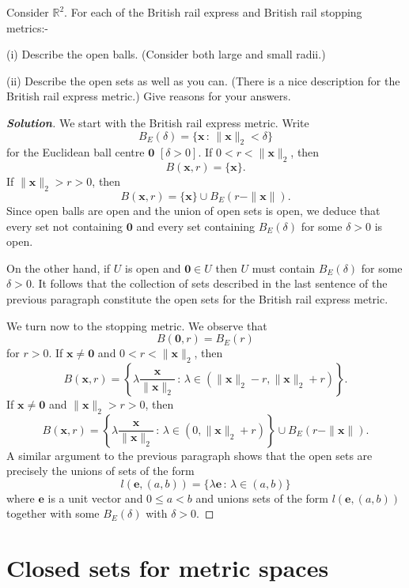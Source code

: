 \begin{theorem}\label{T;British rail balls}
Consider ${\mathbb R}^{2}$.
For each of the British rail express and
British rail stopping metrics:-

(i) Describe the open balls. (Consider both large
and small radii.)

(ii) Describe the open sets as well as you can.
(There is a nice description for the British rail express
metric.) Give reasons for your answers.
\end{theorem}
\begin{proof}[\bf Solution] We start with the British rail express metric.
Write
\[B_{E}(\delta)=\{{\mathbf x}\,:\,\|{\mathbf x}\|_{2}<\delta\}\]
for the Euclidean ball centre ${\mathbf  0}$ $[\delta>0]$.
If $0<r<\|{\mathbf x}\|_{2}$, then
\[B({\mathbf x},r)=\{{\mathbf x}\}.\]
If $\|{\mathbf x}\|_{2}>r>0$, then
\[B({\mathbf x},r)=\{{\mathbf x}\}\cup B_{E}(r-\|{\mathbf x}\|).\]
Since open balls are open and the union of open sets is open,
we deduce that every set not containing ${\mathbf  0}$ and every
set containing $B_{E}(\delta)$ for some $\delta>0$ is open.

On the other hand, if $U$ is open and ${\mathbf 0}\in U$ then
$U$ must contain $B_{E}(\delta)$ for some $\delta>0$.
It follows that the collection of sets described
in the last sentence of the previous
paragraph constitute the open sets for the British rail express metric.

We turn now to the stopping metric. We observe that
\[B({\mathbf  0},r)=B_{E}(r)\]
for $r>0$. If ${\mathbf x}\neq{\mathbf  0}$  and $0<r<\|{\mathbf x}\|_{2}$,
then
\[B({\mathbf x},r)=\left\{\lambda\frac{\mathbf x}{{\|{\mathbf x}\|_{2}}}
\,:\,\lambda\in(\|{\mathbf x}\|_{2}-r,\|{\mathbf x}\|_{2}+r)\right\}.\]
If ${\mathbf x}\neq{\mathbf  0}$ and $\|{\mathbf x}\|_{2}>r>0$, then
\[B({\mathbf x},r)=\left\{\lambda\frac{\mathbf x}{{\|{\mathbf x}\|_{2}}}
\,:\,\lambda\in(0,\|{\mathbf x}\|_{2}+r)\right\}
\cup B_{E}(r-\|{\mathbf x}\|).\]
A similar argument to the previous paragraph shows that the open sets are
precisely the unions of sets of the form
\[l({\mathbf e},(a,b))=\{\lambda{\mathbf e}\,:\,\lambda\in(a,b)\}\]
where ${\mathbf e}$ is a unit vector and $0\leq a<b$ and
unions sets of the form $l({\mathbf e},(a,b))$ together with
some  $B_{E}(\delta)$ with $\delta>0$.
\end{proof}






\section{Closed sets for metric spaces}






